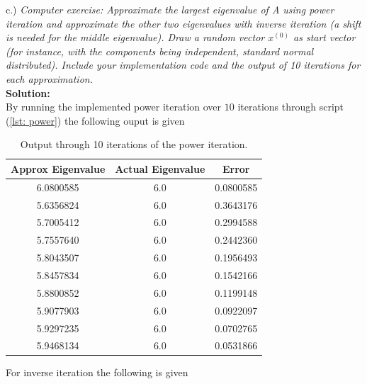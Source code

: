 \documentclass[12pt,
               a4paper,
               article,
               oneside,
               english,oldfontcommands]{memoir}
\let\oldref\ref
\renewcommand{\ref}[1]{(\oldref{#1})}
\newcommand{\spaze}{\vspace{4mm}\\}
\begin{document}
c.) \emph{Computer exercise: Approximate the largest eigenvalue of A using power iteration and approximate the other two eigenvalues with inverse iteration (a shift is needed for the middle eigenvalue). Draw a random vector $x^{(0)}$ as start vector (for instance, with the components being independent, standard normal distributed). Include your implementation code and the output of 10 iterations for each approximation.} \spaze 
\textbf{Solution:} \spaze 
By running the implemented power iteration over $10$ iterations through script \ref{lst: power} the following ouput is given 
\begin{table}[H] 
  \begin{center} 
    \label{tab: power it}
    \begin{tabular}{c c c } 
      \textbf{Approx Eigenvalue}& \textbf{Actual Eigenvalue} & \textbf{Error}\\
      \hline 
      	6.0800585  &     6.0 & 0.0800585\\
      	 5.6356824      &          6.0  & 0.3643176\\
         5.7005412        &        6.0  &0.2994588\\
          5.7557640         &     6.0  &0.2442360\\
          5.8043507        &        6.0&  0.1956493\\
          5.8457834         &       6.0  & 0.1542166\\
          5.8800852          &      6.0 & 0.1199148\\
         5.9077903           &     6.0  &0.0922097\\
         5.9297235              &  6.0 & 0.0702765\\
       5.9468134              &  6.0 & 0.0531866\\
      \hline
    \end{tabular}
     \caption{Output through 10 iterations of the power iteration.}
  \end{center}
\end{table}
For inverse iteration the following is given 
\end{document}

